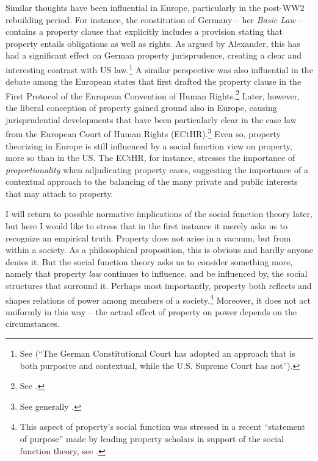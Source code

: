 Similar thoughts have been influential in Europe, particularly in the post-WW2 rebuilding period. For instance, the constitution of Germany -- her {\it Basic Law} -- contains a property clause that explicitly includes a provision stating that property entails obligations as well as rights. As argued by Alexander, this has had a significant effect on German property jurisprudence, creating a clear and interesting contrast with US law.\footnote{See \cite[338]{alexander03} (``The German Constitutional
Court has adopted an approach that is both purposive and contextual, while the U.S. Supreme Court has not'').} A similar perspective was also influential in the debate among the European states that first drafted the property clause in the First Protocol of the European Convention of Human Rights.\footnote{See \cite[1063-1065]{allen10}.} Later, however, the liberal conception of property gained ground also in Europe, causing jurisprudential developments that have been particularly clear in the case law from the European Court of Human Rights (ECtHR).\footnote{See generally \cite{allen10}.} Even so, property theorizing in Europe is still influenced by a social function view on property, more so than in the US. The ECtHR, for instance, stresses the importance of {\it proportionality} when adjudicating property cases, suggesting the importance of a contextual approach to the balancing of the many private and public interests that may attach to property. 

I will return to possible normative implications of the social function theory later, but here I would like to stress that in the first instance it merely asks us to recognize an empirical truth. Property does not arise in a vacuum, but from within a society. As a philosophical proposition, this is obvious and hardly anyone denies it. But the social function theory asks us to consider something more, namely that property {\it law} continues to influence, and be influenced by, the social structures that surround it. Perhaps most importantly, property both reflects and shapes relations of power among members of a society.\footnote{This aspect of property's social function was stressed in a recent ``statement of purpose'' made by leading property scholars in support of the social function theory, see \cite{alexandder09a}.} Moreover, it does not act uniformly in this way -- the actual effect of property on power depends on the circumstances.

